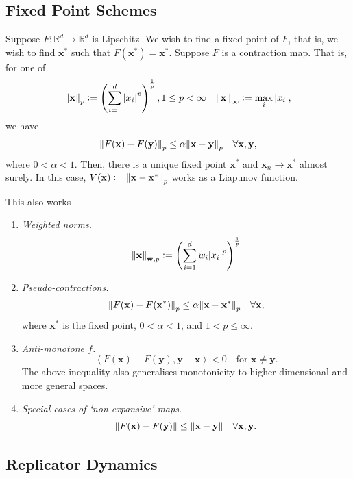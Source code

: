 \subsection{Fixed Point Schemes}

Suppose $F \colon \mathbb{R}^d \to \mathbb{R}^d$ is Lipschitz. We wish to find a fixed point of $F$, that is, we wish to find $\mathbf{x}^*$ such that $F(\mathbf{x}^*) = \mathbf{x}^*$. Suppose $F$ is a contraction map. That is, for one of
\[
    \norm{\mathbf{x}}_p \vcentcolon= \left( \sum_{i=1}^d \abs{x_i}^p \right)^{\frac{1}{p}}, 1 \leq p < \infty \quad \norm{\mathbf{x}}_{\infty} \vcentcolon= \max_i \abs{x_i},
\]
we have
\[
    \norm{F(\mathbf{x}) - F(\mathbf{y})}_p \leq \alpha \norm{\mathbf{x} - \mathbf{y}}_p \quad \forall \mathbf{x,y},
\]
where $0 < \alpha < 1$. Then, there is a unique fixed point $\mathbf{x}^*$ and $\mathbf{x}_n \to \mathbf{x}^*$ almost surely. In this case, $V(\mathbf{x}) \vcentcolon= \norm{\mathbf{x} - \mathbf{x}^*}_p$ works as a Liapunov function. 

This also works 
\begin{enumerate}
    \item \emph{Weighted norms.} 
    \[
        \norm{\mathbf{x}}_{\mathbf{w},p} \vcentcolon= \left( \sum_{i=1}^d w_i \abs{x_i}^p \right)^{\frac{1}{p}}
    \]
    \item \emph{Pseudo-contractions.} 
    \[
        \norm{F(\mathbf{x}) - F(\mathbf{x}^*)}_p \leq \alpha \norm{\mathbf{x} - \mathbf{x}^*}_p \quad \forall \mathbf{x},
    \]
    where $\mathbf{x}^*$ is the fixed point, $0 < \alpha < 1$, and $1 < p \leq \infty$. 
    
    \item \emph{Anti-monotone $f$.} 
    \[
        \left\langle F(\mathbf{x}) - F(\mathbf{y}), \mathbf{y} - \mathbf{x} \right\rangle < 0 \quad \text{for } \mathbf{x} \neq \mathbf{y}.
    \]
    The above inequality also generalises monotonicity to higher-dimensional and more general spaces. 
    
    \item \emph{Special cases of `non-expansive' maps.} 
    \[
        \norm{F(\mathbf{x}) - F(\mathbf{y})} \leq  \norm{\mathbf{x} - \mathbf{y}} \quad \forall \mathbf{x,y}.
    \]
\end{enumerate}

\subsection{Replicator Dynamics}

